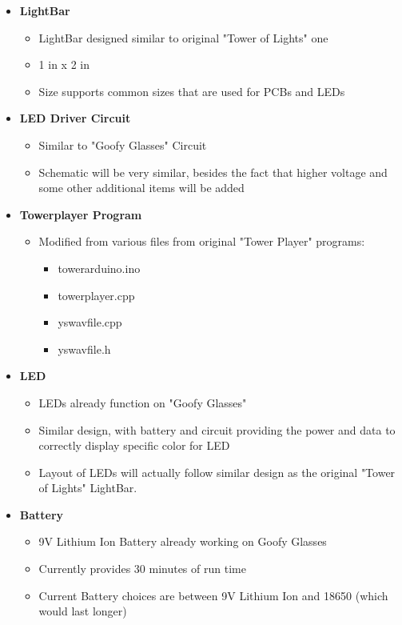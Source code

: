 \documentclass[12pt]{article}
\begin{document}
{		%
		{\renewcommand\labelitemi{}
			\begin{itemize}
				\item \textbf{LightBar}
				\begin{itemize}
					\item LightBar designed similar to original "Tower of Lights" one
					\item 1 in x 2 in
					\item Size supports common sizes that are used for PCBs and LEDs
				\end{itemize}
				\item \textbf{LED Driver Circuit}
				\begin{itemize}
					\item Similar to "Goofy Glasses" Circuit
					\item Schematic will be very similar, besides the fact that higher voltage and some other additional items will be added
				\end{itemize}
				\item \textbf{Towerplayer Program}
				\begin{itemize}
					\item Modified from various files from original "Tower Player" programs:
					\begin{itemize}
						\item towerarduino.ino
						\item towerplayer.cpp
						\item yswavfile.cpp
						\item yswavfile.h
					\end{itemize}
				\end{itemize}
				\item \textbf{LED}
				\begin{itemize}
					\item LEDs already function on "Goofy Glasses"
					\item Similar design, with battery and circuit providing the power and data to correctly display specific color for LED
					\item Layout of LEDs will actually follow similar design as the original "Tower of Lights" LightBar.
				\end{itemize}
				\item \textbf{Battery}
				\begin{itemize}
					\item 9V Lithium Ion Battery already working on Goofy Glasses
					\item Currently provides 30 minutes of run time
					\item Current Battery choices are between 9V Lithium Ion and 18650 (which would last longer)
				\end{itemize}
			\end{itemize}
		
}}
\end{document}
